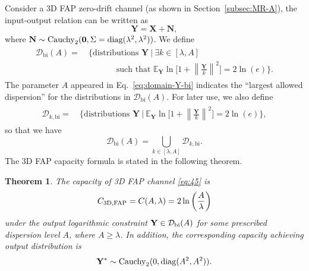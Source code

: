 \documentclass[conference]{IEEEtran}
\newcommand{\E}{\mathbb{E}}
\theoremstyle{definition}
\theoremstyle{plain}
\newtheorem{thm}{Theorem}
\newcommand{\norm}[1]{\left\lVert#1\right\rVert}
\begin{document}
Consider a 3D FAP zero-drift channel (as shown in Section~\ref{subsec:MR-A}), the input-output relation can be written as
\begin{equation}
    \mathbf{Y}=\mathbf{X}+\mathbf{N},
\label{eq:45}
\end{equation}
where
$\mathbf{N}\sim{\rm Cauchy}_2 (\mathbf{0},\Sigma=\text{diag}(\lambda^2,\lambda^2))$.
We define
\begin{align}
\begin{split}
\mathcal{D}_{\text{bi}}(A)
=\ 
&\Bigg\{\text{distributions\ }\mathbf{Y}\ \Bigg|\ \exists k\in[\lambda,A]\\ 
&\quad\quad\quad\text{\ such that\ }
\E_\mathbf{Y} \ln \Big[1+\norm{\frac{\mathbf{Y}}{k}}^2\Big] = 2\ln(e)
\Bigg\}.
\end{split}
\label{eq:domain-Y-bi}
\end{align}
The parameter $A$ appeared in Eq.~\eqref{eq:domain-Y-bi} indicates the ``largest allowed dispersion'' for the distributions in $\mathcal{D}_{\text{bi}}(A)$. 
For later use, we also define
\begin{align}
\begin{split}
\mathcal{D}_{k,\text{bi}}
=\ 
&\Bigg\{\text{distributions\ }\mathbf{Y}\ \Bigg|\
\E_\mathbf{Y} \ln \Big[1+\norm{\frac{\mathbf{Y}}{k}}^2\Big] = 2\ln(e)
\Bigg\},
\end{split}
\label{eq:domain-k-bi}
\end{align}
so that we have
\begin{equation}
    \mathcal{D}_{\text{bi}}(A)=\bigcup_{k\in[\lambda,A]} \mathcal{D}_{k,\text{bi}}.
\end{equation}
The 3D FAP capacity formula is stated in the following theorem.
\begin{thm}
The capacity of 3D FAP channel \eqref{eq:45}  is
\begin{equation}
    C_{\rm{3D,FAP}}=C(A,\lambda)=2\ln\left(\dfrac{A}{\lambda}\right)
\end{equation}
under the output logarithmic constraint
$
\mathbf{Y}\in \mathcal{D}_{{\rm bi}}(A)
$
for some 
prescribed dispersion level $A$, where $A \geq \lambda$. In addition, the corresponding capacity achieving output distribution is
\begin{equation}
\mathbf{Y}^* \sim {\rm Cauchy}_2(0,{\rm diag}(A^2,A^2)).
\end{equation}
\label{thm:T2}
\end{thm}
\end{document}
